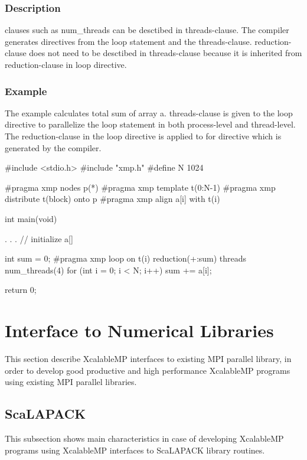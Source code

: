 \subsection*{Description}

   {\OMP} clauses such as num\_threads can be desctibed in threads-clause.
   The {\XMP} compiler generates {\OMP} directives from the {\XMP} loop statement and the threads-clause.
   reduction-clause does not need to be desctibed in threads-clause
   because it is inherited from reduction-clause in {\XMP} loop directive.

\subsection*{Example}

   The example calculates total sum of array a.
   threads-clause is given to the loop directive to parallelize the loop statement in both process-level and thread-level.
   The reduction-clause in the loop directive is applied to {\OMP} for directive which is generated by the {\XMP} compiler.

\begin{Cexample}
#include <stdio.h>
#include "xmp.h"
#define N 1024

#pragma xmp nodes p(*)
#pragma xmp template t(0:N-1)
#pragma xmp distribute t(block) onto p
#pragma xmp align a[i] with t(i)

int main(void) {
  . . . // initialize a[]

  int sum = 0;
#pragma xmp loop on t(i) reduction(+:sum) threads num\_threads(4)
  for (int i = 0; i < N; i++) {
    sum += a[i];
  }

  return 0;
}
\end{Cexample}


\chapter{Interface to Numerical Libraries}

   This section describe XcalableMP interfaces to existing MPI parallel library, 
   in order to develop good productive and high performance XcalableMP programs 
   using existing MPI parallel libraries.
   
\section{ScaLAPACK}

   This subsection shows main characteristics in case of developing
   XcalableMP programs using XcalableMP interfaces to ScaLAPACK library routines.

